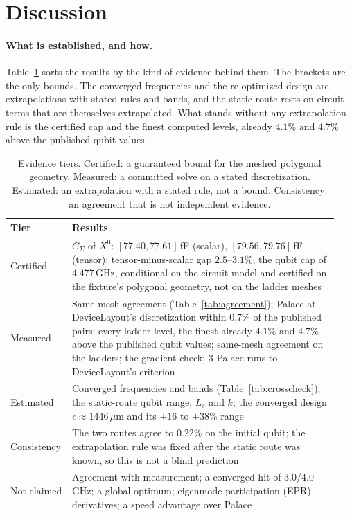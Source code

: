 \documentclass{anvil-paper}
\begin{document}
\section{Discussion}
\label{sec:discussion}

\paragraph{What is established, and how.}
Table~\ref{tab:tiers} sorts the results by the kind of evidence behind
them. The brackets are the only bounds. The converged frequencies and the
re-optimized design are extrapolations with stated rules and bands, and
the static route rests on circuit terms that are themselves
extrapolated. What stands without any extrapolation rule is the
certified cap and the finest computed levels, already $4.1\%$ and
$4.7\%$ above the published qubit values.

\begin{table}[tbp]
  \centering
  \caption{Evidence tiers. Certified: a guaranteed bound for the meshed
  polygonal geometry. Measured: a committed solve on a stated
  discretization. Estimated: an extrapolation with a stated rule, not a
  bound. Consistency: an agreement that is not independent evidence.}
  \label{tab:tiers}
  \footnotesize
  \begin{tabular}{@{}>{\raggedright\arraybackslash}p{0.15\linewidth}>{\raggedright\arraybackslash}p{0.79\linewidth}@{}}
    \toprule
    Tier & Results \\
    \midrule
    Certified & $C_\Sigma$ of $X^0$: $[77.40, 77.61]$\,fF (scalar), $[79.56, 79.76]$\,fF (tensor); tensor-minus-scalar gap $2.5$--$3.1\%$; the qubit cap of $4.477$\,GHz, conditional on the circuit model and certified on the fixture's polygonal geometry, not on the ladder meshes \\
    Measured & Same-mesh agreement (Table~\ref{tab:agreement}); Palace at DeviceLayout's discretization within $0.7\%$ of the published pairs; every ladder level, the finest already $4.1\%$ and $4.7\%$ above the published qubit values; same-mesh agreement on the ladders; the gradient check; 3 Palace runs to DeviceLayout's criterion \\
    Estimated & Converged frequencies and bands (Table~\ref{tab:crosscheck}); the static-route qubit range; $L_s$ and $k$; the converged design $c \approx 1446\,\mu$m and its $+16$ to $+38\%$ range \\
    Consistency & The two routes agree to $0.22\%$ on the initial qubit; the extrapolation rule was fixed after the static route was known, so this is not a blind prediction \\
    Not claimed & Agreement with measurement; a converged hit of $3.0$/$4.0$\,GHz; a global optimum; eigenmode-participation (EPR) derivatives; a speed advantage over Palace \\
    \bottomrule
  \end{tabular}
\end{table}
\end{document}
